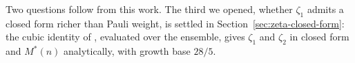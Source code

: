 Two questions follow from this work. The third we opened,
whether \(\zeta_1\) admits a closed form richer than Pauli weight, is
settled in Section~\ref{sec:zeta-closed-form}: the cubic identity of
\cite{huang2020shadows}, evaluated over the ensemble, gives \(\zeta_1\)
and \(\zeta_2\) in closed form and \(M^*(n)\) analytically, with growth
base \(28/5\).









